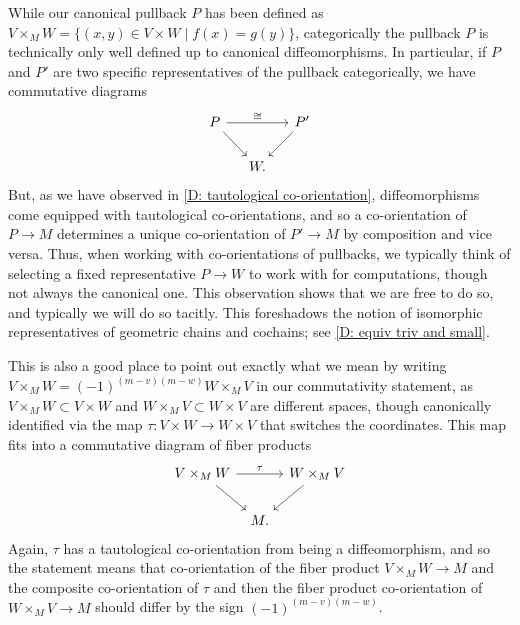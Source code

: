 \begin{remark}\label{R: pullback representative}
	While our canonical pullback $P$ has been defined as $V \times_M W = \{(x,y) \in V \times W \mid f(x) = g(y)\}$, categorically the pullback $P$ is technically only well defined up to canonical diffeomorphisms.
	In particular, if $P$ and $P'$ are two specific representatives of the pullback categorically, we have commutative diagrams
	\begin{equation}\label{D: comm triangle}
		\begin{tikzcd}[column sep=small]
			P \arrow[rr, "\cong"] \arrow[dr] & & P' \arrow[dl] \\
			& W. &
		\end{tikzcd}
	\end{equation}
	But, as we have observed in \cref{D: tautological co-orientation}, diffeomorphisms come equipped with tautological co-orientations, and so a co-orientation of $P \to M$ determines a unique co-orientation of $P' \to M$ by composition and vice versa.
	Thus, when working with co-orientations of pullbacks, we typically think of selecting a fixed representative $P \to W$ to work with for computations, though not always the canonical one.
	This observation shows that we are free to do so, and typically we will do so tacitly.
	This foreshadows the notion of isomorphic representatives of geometric chains and cochains; see \cref{D: equiv triv and small}.
\end{remark}

\begin{remark}\label{R: precise commutativity}
	This is also a good place to point out exactly what we mean by writing $V \times_M W = (-1)^{(m-v)(m-w)}W \times_M V$ in our commutativity statement, as $V \times_M W \subset V \times W$ and $W \times_M V \subset W \times V$ are different spaces, though canonically identified via the map $\tau \colon V \times W \to W \times V$ that switches the coordinates.
	This map fits into a commutative diagram of fiber products
	\[
	\begin{tikzcd}[column sep=tiny]
		V \times_M W \arrow[rr, "\tau"] \arrow[dr] & & W \times_M V \arrow[dl] \\
		& M. &
	\end{tikzcd}
	\]
	Again, $\tau$ has a tautological co-orientation from being a diffeomorphism, and so the statement means that co-orientation of the fiber product $V \times_M W \to M$ and the composite co-orientation of $\tau$ and then the fiber product co-orientation of $W \times_M V \to M$ should differ by the sign $(-1)^{(m-v)(m-w)}$.
\end{remark}

